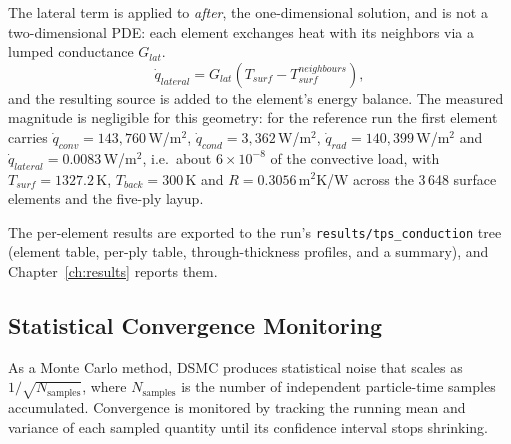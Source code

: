The lateral term is applied to \emph{after}, the one-dimensional solution, and is not a two-dimensional PDE: each element exchanges heat with its neighbors via a lumped conductance $G_{lat}$.
\begin{equation}
    \dot{q}_{lateral} = G_{lat}\left(T_{surf}-T_{surf}^{neighbours}\right),
    \label{eq:lateral}
\end{equation}
and the resulting source is added to the element's energy balance. The measured magnitude is negligible for this geometry: for the reference run the first element carries $\dot{q}_{conv}=143{,}760$\,W/m$^2$, $\dot{q}_{cond}=3{,}362$\,W/m$^2$, $\dot{q}_{rad}=140{,}399$\,W/m$^2$ and $\dot{q}_{lateral}=0.0083$\,W/m$^2$, i.e.\ about $6\times10^{-8}$ of the convective load, with $T_{surf}=1327.2$\,K, $T_{back}=300$\,K and $R=0.3056$\,m$^2$K/W across the 3\,648 surface elements and the five-ply layup.

The per-element results are exported to the run's \texttt{results/tps\_conduction} tree (element table, per-ply table, through-thickness profiles, and a summary), and Chapter~\ref{ch:results} reports them.


\subsection{Statistical Convergence Monitoring}
As a Monte Carlo method, DSMC produces statistical noise that scales as $1/\sqrt{N_{\text{samples}}}$, where $N_{\text{samples}}$ is the number of independent particle-time samples accumulated. Convergence is monitored by tracking the running mean and variance of each sampled quantity until its confidence interval stops shrinking.

